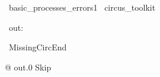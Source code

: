 
\begin{zsection}
  \SECTION\ basic\_processes\_errors1 \parents\ circus\_toolkit
\end{zsection}

\begin{circus}
    \circchannel\ out: \nat
\end{circus}


\begin{circus}
    \circprocess\ MissingCircEnd ~~\circdef~~ \circbegin
\end{circus}

\begin{circusaction}
    @ out.0 \then Skip
\end{circusaction}

